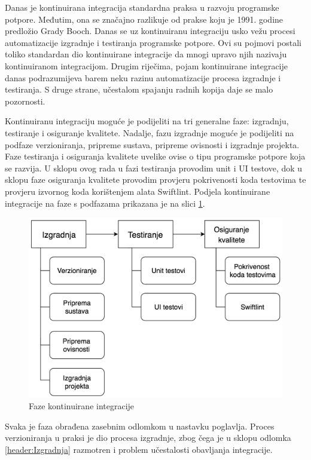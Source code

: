 \documentclass[times, utf8, diplomski, numeric]{fer}
\begin{document}
Danas je kontinuirana integracija standardna praksa u razvoju programske potpore. Međutim, ona se značajno razlikuje od prakse koju je 1991. godine predložio Grady Booch. Danas se uz kontinuiranu integraciju usko vežu procesi automatizacije izgradnje i testiranja programske potpore. Ovi su pojmovi postali toliko standardan dio kontinuirane integracije da mnogi upravo njih nazivaju kontinuiranom integracijom. Drugim riječima, pojam kontinuirane integracije danas podrazumijeva barem neku razinu automatizacije procesa izgradnje i testiranja. S druge strane, učestalom spajanju radnih kopija daje se malo pozornosti.

Kontinuiranu integraciju moguće je podijeliti na tri generalne faze: izgradnju, testiranje i osiguranje kvalitete. Nadalje, fazu izgradnje moguće je podijeliti na podfaze verzioniranja, pripreme sustava, pripreme ovisnosti i izgradnje projekta. Faze testiranja i osiguranja kvalitete uvelike ovise o tipu programske potpore koja se razvija. U sklopu ovog rada u fazi testiranja provodim unit i UI testove, dok u sklopu faze osiguranja kvalitete provodim provjeru pokrivenosti koda testovima te provjeru izvornog koda korištenjem alata Swiftlint. Podjela kontinuirane integracije na faze s podfazama prikazana je na slici \ref{fig:CIFazes}.

\begin{figure}
\centering
\includegraphics[scale=0.6]{CIFazes}
\caption{Faze kontinuirane integracije}
\label{fig:CIFazes}
\end{figure}

Svaka je faza obrađena zasebnim odlomkom u nastavku poglavlja. Proces verzioniranja u praksi je dio procesa izgradnje, zbog čega je u sklopu odlomka \ref{header:Izgradnja} razmotren i problem učestalosti obavljanja integracije.
\end{document}
